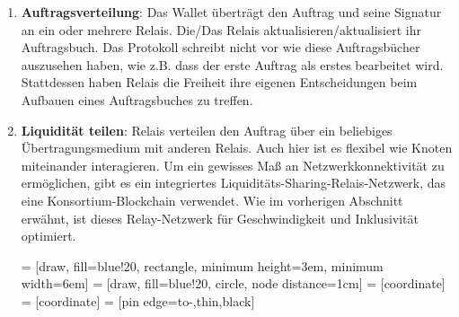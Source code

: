 \documentclass[UTF8,nofonts]{article}
\makeatletter
\newenvironment{figurehere}
 {\def\@captype{figure}}
 {}
\makeatother
\begin{document}
\begin{multicols}{2}
\begin{enumerate}
\item \textbf{Auftragsverteilung}: Das Wallet überträgt den Auftrag und seine Signatur an ein oder mehrere Relais. Die/Das Relais aktualisieren/aktualisiert ihr Auftragsbuch. Das Protokoll schreibt nicht vor wie diese Auftragsbücher auszusehen haben, wie z.B. dass der erste Auftrag als erstes bearbeitet wird. Stattdessen haben Relais die Freiheit ihre eigenen Entscheidungen beim Aufbauen eines Auftragsbuches zu treffen.

\item \textbf{Liquidität teilen}: Relais verteilen den Auftrag über ein beliebiges Übertragungsmedium mit anderen Relais. Auch hier ist es flexibel wie Knoten miteinander interagieren. Um ein gewisses Maß an Netzwerkkonnektivität zu ermöglichen, gibt es ein integriertes Liquiditäts-Sharing-Relais-Netzwerk, das eine Konsortium-Blockchain verwendet. Wie im vorherigen Abschnitt erwähnt, ist dieses Relay-Netzwerk für Geschwindigkeit und Inklusivität optimiert.

\begin{center}
\begin{figurehere}
\centering
{} = [draw, fill=blue!20, rectangle, 
    minimum height=3em, minimum width=6em]
 = [draw, fill=blue!20, circle, node distance=1cm]
 = [coordinate]
 = [coordinate]
 = [pin edge={to-,thin,black}]

\end{figurehere}
\end{center}
\end{enumerate}
\end{multicols}
\end{document}
